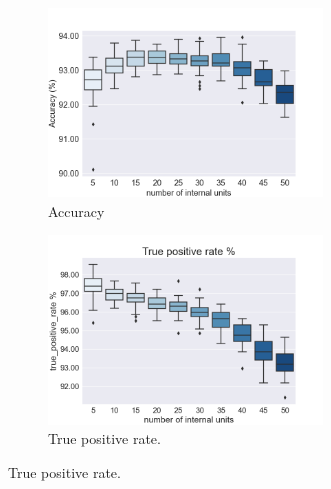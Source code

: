 \begin{multicols}{2}
\begin{figure}[H]
    \centering
    \begin{subfigure}[b]{0.6\textwidth}
        \centering
        \includegraphics[width=0.8\textwidth]{img/accuracy.png}
        \caption{Accuracy}
        \label{fig:accuracy}
    \end{subfigure}
    \begin{subfigure}[b]{0.6\textwidth}
        \centering
        \includegraphics[width=0.8\textwidth]{img/true_positive_rate.png}
        \caption{True positive rate.}
        \label{fig:true_positive_rate}
    \end{subfigure}
\end{figure}


\end{multicols}
